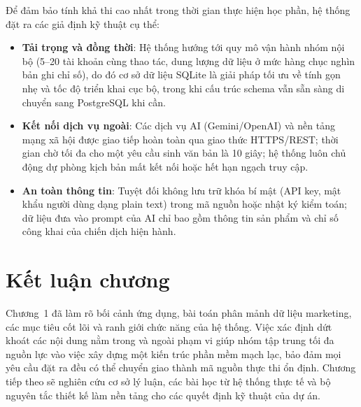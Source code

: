 Để đảm bảo tính khả thi cao nhất trong thời gian thực hiện học phần, hệ thống đặt ra các giả định kỹ thuật cụ thể:
\begin{itemize}
\item \textbf{Tải trọng và đồng thời}: Hệ thống hướng tới quy mô vận hành nhóm nội bộ (5--20 tài khoản cùng thao tác, dung lượng dữ liệu ở mức hàng chục nghìn bản ghi chỉ số), do đó cơ sở dữ liệu SQLite là giải pháp tối ưu về tính gọn nhẹ và tốc độ triển khai cục bộ, trong khi cấu trúc schema vẫn sẵn sàng di chuyển sang PostgreSQL khi cần.
\item \textbf{Kết nối dịch vụ ngoài}: Các dịch vụ AI (Gemini/OpenAI) và nền tảng mạng xã hội được giao tiếp hoàn toàn qua giao thức HTTPS/REST; thời gian chờ tối đa cho một yêu cầu sinh văn bản là 10 giây; hệ thống luôn chủ động dự phòng kịch bản mất kết nối hoặc hết hạn ngạch truy cập.
\item \textbf{An toàn thông tin}: Tuyệt đối không lưu trữ khóa bí mật (API key, mật khẩu người dùng dạng plain text) trong mã nguồn hoặc nhật ký kiểm toán; dữ liệu đưa vào prompt của AI chỉ bao gồm thông tin sản phẩm và chỉ số công khai của chiến dịch hiện hành.
\end{itemize}

\section{Kết luận chương}

Chương~1 đã làm rõ bối cảnh ứng dụng, bài toán phân mảnh dữ liệu marketing, các mục tiêu cốt lõi và ranh giới chức năng của hệ thống. Việc xác định dứt khoát các nội dung nằm trong và ngoài phạm vi giúp nhóm tập trung tối đa nguồn lực vào việc xây dựng một kiến trúc phần mềm mạch lạc, bảo đảm mọi yêu cầu đặt ra đều có thể chuyển giao thành mã nguồn thực thi ổn định. Chương tiếp theo sẽ nghiên cứu cơ sở lý luận, các bài học từ hệ thống thực tế và bộ nguyên tắc thiết kế làm nền tảng cho các quyết định kỹ thuật của dự án.
